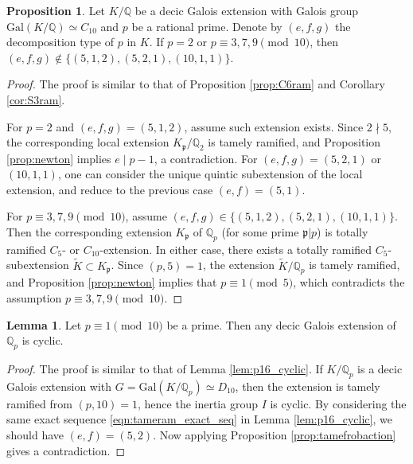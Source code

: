 \documentclass[letterpaper, 10pt]{article}
\newcommand{\Gal}{\mathrm{Gal}}
\newcommand{\bQ}{\mathbb{Q}}
\newcommand{\frp}{\mathfrak{p}}
\newcommand{\1}{\mathds{1}}	%
\theoremstyle{definition}
\newtheorem{proposition}[theorem]{Proposition}
\newtheorem{lemma}[theorem]{Lemma}
\theoremstyle{remark}
\begin{document}
\begin{proposition}
\label{prop:C10ram}
    Let $K / \bQ$ be a decic Galois extension with Galois group $\Gal(K / \bQ) \simeq C_{10}$ and $p$ be a rational prime.
Denote by $(e, f, g)$ the decomposition type of $p$ in $K$.
    If $p = 2$ or $p \equiv 3, 7, 9 \pmod{10}$, then $(e, f, g) \not\in  \{(5, 1, 2), (5, 2, 1), (10, 1, 1)\}$.
\end{proposition}
\begin{proof}
    The proof is similar to that of Proposition \ref{prop:C6ram} and Corollary \ref{cor:S3ram}.
    
    For $p = 2$ and $(e, f, g) = (5, 1, 2)$, assume such extension exists.
    Since $2 \nmid 5$, the corresponding local extension $K_\frp / \bQ_2$ is tamely ramified, and Proposition \ref{prop:newton} implies $e \mid p - 1$, a contradiction.
    For $(e, f, g) = (5, 2, 1)$ or $(10, 1, 1)$, one can consider the unique quintic subextension of the local extension, and reduce to the previous case $(e, f) = (5, 1)$.
    

    For $p \equiv 3,7,9 \pmod{10}$, assume $(e, f, g) \in \{(5, 1, 2), (5, 2, 1), (10, 1, 1)\}$.
    Then the corresponding extension $K_\frp$ of $\bQ_p$ (for some prime $\frp | p$) is totally ramified $C_{5}$- or $C_{10}$-extension. In either case, there exists a totally ramified $C_{5}$-subextension $\tilde K \subset K_\frp$.
    Since $(p, 5) = 1$, the extension $\tilde K / \mathbb Q_p$ is tamely ramified, and Proposition \ref{prop:newton} implies that $p \equiv 1 \pmod{5}$, which contradicts the assumption $p \equiv 3,7,9 \pmod{10}$.
\end{proof}

\begin{lemma}
    \label{lem:p110_cyclic}
    Let $p \equiv 1 \pmod{10}$ be a prime. Then any decic Galois extension of $\bQ_p$ is cyclic.    
\end{lemma}
\begin{proof}
    The proof is similar to that of Lemma \ref{lem:p16_cyclic}.
     If $K / \bQ_p$ is a decic Galois extension with $G = \Gal(K / \bQ_p) \simeq D_{10}$, then the extension is tamely ramified from $(p, 10) = 1$, hence the inertia group $I$ is cyclic. By considering the same exact sequence \eqref{eqn:tameram_exact_seq} in Lemma \ref{lem:p16_cyclic}, we should have $(e, f) = (5, 2)$. Now applying Proposition \ref{prop:tamefrobaction} gives a contradiction. 
\end{proof}
\end{document}
